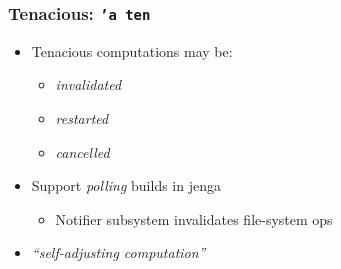 \documentclass{beamer}
\begin{document}

\begin{frame}[fragile]
\huge
\begin{center}
\end{center}
\end{frame}

% 

% 


\begin{frame}[fragile]
\frametitle{Tenacious: {\tt 'a ten}}
\begin{itemize}
\item Tenacious computations may be:
\begin{itemize}
\item {\em invalidated}
\item {\em restarted}
\item {\em cancelled}
\end{itemize}
\item Support {\em polling}\/ builds in jenga
\begin{itemize}
\item Notifier subsystem invalidates file-system ops
\end{itemize}
\item {\em ``self-adjusting computation''}
\end{itemize}
\end{frame}


% 
% 
\end{document}
